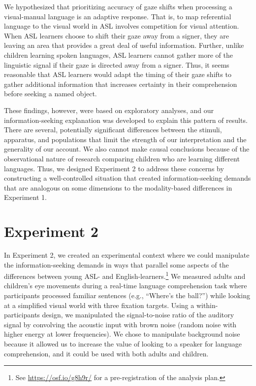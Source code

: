 \documentclass[,man,floatsintext]{apa6}
\let\rmarkdownfootnote\footnote%
\def\footnote{\protect\rmarkdownfootnote}
\begin{document}
We hypothesized that prioritizing accuracy of gaze shifts when
processing a visual-manual language is an adaptive response. That is, to
map referential language to the visual world in ASL involves competition
for visual attention. When ASL learners choose to shift their gaze away
from a signer, they are leaving an area that provides a great deal of
useful information. Further, unlike children learning spoken languages,
ASL learners cannot gather more of the linguistic signal if their gaze
is directed away from a signer. Thus, it seems reasonable that ASL
learners would adapt the timing of their gaze shifts to gather
additional information that increases certainty in their comprehension
before seeking a named object.

These findings, however, were based on exploratory analyses, and our
information-seeking explanation was developed to explain this pattern of
results. There are several, potentially significant differences between
the stimuli, apparatus, and populations that limit the strength of our
interpretation and the generality of our account. We also cannot make
causal conclusions because of the observational nature of research
comparing children who are learning different languages. Thus, we
designed Experiment 2 to address these concerns by constructing a
well-controlled situation that created information-seeking demands that
are analogous on some dimensions to the modality-based differences in
Experiment 1.

\section{Experiment 2}\label{experiment-2}

In Experiment 2, we created an experimental context where we could
manipulate the information-seeking demands in ways that parallel some
aspects of the differences between young ASL- and
English-learners.\footnote{See \url{https://osf.io/g8h9r/} for a
  pre-registration of the analysis plan.} We measured adults and
children's eye movements during a real-time language comprehension task
where participants processed familiar sentences (e.g., \enquote{Where's
the ball?}) while looking at a simplified visual world with three
fixation targets. Using a within-participants design, we manipulated the
signal-to-noise ratio of the auditory signal by convolving the acoustic
input with brown noise (random noise with higher energy at lower
frequencies). We chose to manipulate background noise because it allowed
us to increase the value of looking to a speaker for language
comprehension, and it could be used with both adults and children.
\end{document}
